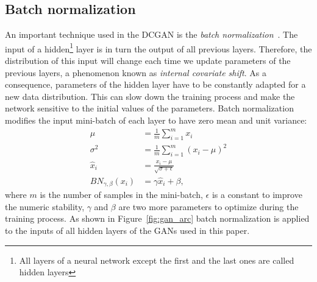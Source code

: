\subsection{Batch normalization}
An important technique used in the DCGAN is the \textit{batch normalization}~\cite{batch_norm}. The input of a hidden\footnote{All layers of a neural network except the first and the last ones are called hidden layers} layer is in turn the output of all previous layers. Therefore, the distribution of this input will change each time we update parameters of the previous layers, a phenomenon known as \textit{internal covariate shift}. As a consequence, parameters of the hidden layer have to be constantly adapted for a new data distribution. This can slow down the training process and make the network sensitive to the initial values of the parameters. Batch normalization modifies the input mini-batch of each layer to have zero mean and unit variance: 
\begin{align*}
	\mu &= \frac{1}{m} \sum_{i=1}^{m}x_i \\
	\sigma^2 &= \frac{1}{m} \sum_{i=1}^{m}(x_i - \mu)^2 \\
	\hat{x}_i &= \frac{x_i - \mu}{\sqrt{\sigma+\epsilon}} \\
	BN_{\gamma, \beta}(x_i) &= \gamma \hat{x}_i + \beta,
\end{align*}
where $m$ is the number of samples in the mini-batch, $\epsilon$ is a constant to improve the numeric stability, $\gamma$ and $\beta$ are two more parameters to optimize during the training process. As shown in Figure~\ref{fig:gan_arc} batch normalization is applied to the inputs of all hidden layers of the GANs used in this paper.
